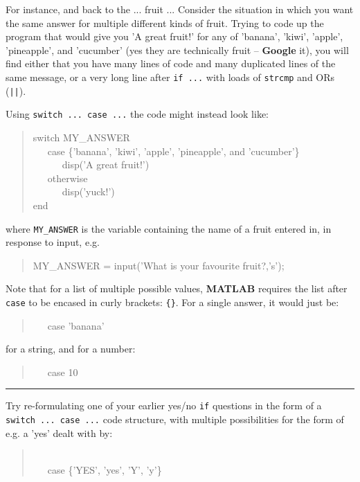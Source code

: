 \documentclass{tufte-book} %
\newenvironment{docspec}{\begin{quotation}\ttfamily\parskip0pt\parindent0pt\ignorespaces}{\end{quotation}}
\begin{document}
For instance, and back to the ... fruit ... Consider the situation in which you want the same answer for multiple different kinds of fruit. Trying to code up the program that would give you 'A great fruit!' for any of 'banana', 'kiwi', 'apple', 'pineapple', and 'cucumber' (yes they are technically fruit -- \textbf{Google} it), you will find either that you have many lines of code and many duplicated lines of the same message, or a very long line after \texttt{if ...} with loads of \texttt{strcmp} and ORs (\texttt{||}).

Using \texttt{switch ... case ...} the code might instead look like:
 
\begin{docspec}
switch MY\_ANSWER
\\ \ \ \ case \{'banana', 'kiwi', 'apple', 'pineapple', and 'cucumber'\}
\\ \ \ \ \ \ \ disp('A great fruit!')
\\ \ \ \ otherwise
\\ \ \ \ \ \ \ disp('yuck!')
\\end
\end{docspec}

\noindent where \texttt{MY\_ANSWER} is the variable containing the name of a fruit entered in, in response to input, e.g.
\begin{docspec}
MY\_ANSWER = input('What is your favourite fruit?,'s');
\end{docspec}

Note that for a list of multiple possible values, \textbf{MATLAB} requires the list after \texttt{case} to be encased in curly brackets: \texttt{\{\}}. For a single answer, it would just be:
\begin{docspec}
\ \ \ case 'banana'  
\end{docspec}
for a string, and for a number:
\begin{docspec}
\ \ \ case 10  
\end{docspec}

\vspace{1mm}
\noindent\rule{4cm}{0.5pt}
\vspace{1mm}

\noindent Try re-formulating one of your earlier yes/no \texttt{if} questions in the form of a \texttt{switch ... case ...} code structure, with multiple possibilities for the form of e.g. a 'yes' dealt with by:

\vspace{-4mm}
\begin{docspec}
\\ \ \ \ case \{'YES', 'yes', 'Y', 'y'\}
\end{docspec}
\end{document}
